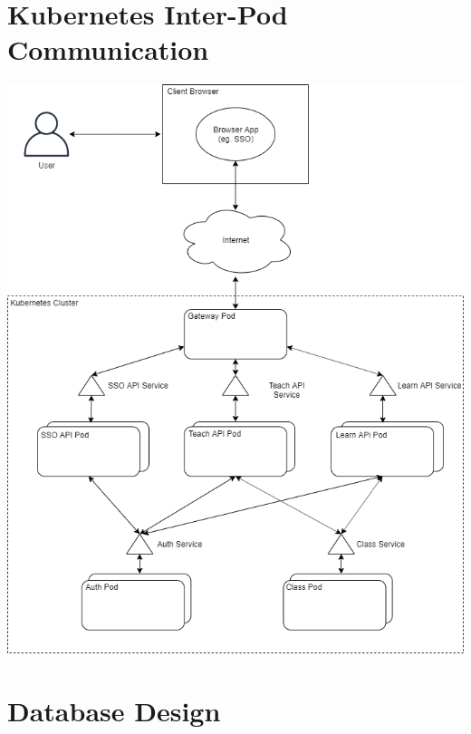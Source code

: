 \documentclass[12pt]{article}
\begin{document}
\section{Kubernetes Inter-Pod Communication}
    \begin{center}\includegraphics[width=\textwidth]{images/pod-inter-coms.png}\end{center}

\section{Database Design}

\label{EndOfSpecs}
\end{document}
